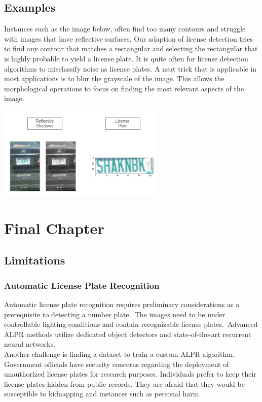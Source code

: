 \documentclass[a4paper,twoside,10pt]{report}
\begin{document}
\section{Examples}
Instances such as the image below, often find too many contours and struggle with images that have reflective surfaces.
Our adaption of license detection tries to find any contour that matches a rectangular and selecting the rectangular that is highly probable to yield a license plate.
It is quite often for license detection algorithms to misclassify noise as license plates. A neat trick that is applicable in most applications is to blur the grayscale of the image.
This allows the morphological operations to focus on finding the most relevant aspects of the image. 
\begin{center}
  \includegraphics[width=8cm]{images/Reflective surface.png}
\end{center}


 
\chapter{Final Chapter}

\section{Limitations}
\subsection{Automatic License Plate Recognition}
Automatic license plate recognition requires preliminary considerations as a prerequisite to detecting a number plate.\ 
The images need to be under controllable lighting conditions and contain recognizable license plates.\ 
Advanced ALPR methods utilize dedicated object detectors and state-of-the-art recurrent neural networks.\\ [4pt]

Another challenge is finding a dataset to train a custom ALPR algorithm. Government officials have security concerns regarding the deployment of unauthorized license plates for research purposes. Individuals prefer to keep their license plates hidden from public records. They are afraid that they would be susceptible to kidnapping and instances such as personal harm. 
\end{document}
